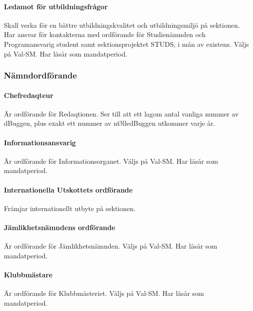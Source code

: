 \documentclass[a4paper,12pt]{article}
\begin{document}
\paragraph{Ledamot för utbildningsfrågor}

Skall verka för en bättre utbildningskvalitet och utbildningsmiljö på sektionen. Har ansvar för kontakterna med ordförande för Studienämnden och Programansvarig student samt sektionsprojektet STUDS, i mån av existens. Väljs på Val-SM. Har läsår som mandatperiod.

\subsubsection{Nämndordförande}

\paragraph{Chefredaqteur}

Är ordförande för Redaqtionen. Ser till att ett lagom antal vanliga nummer av dBuggen, plus exakt ett nummer av nØlledBuggen utkommer varje år.

\paragraph{Informationsansvarig}

Är ordförande för Informationsorganet. Väljs på Val-SM. Har läsår som mandatperiod.

\paragraph{Internationella Utskottets ordförande}

Främjar internationellt utbyte på sektionen.

\paragraph{Jämlikhetsnämndens ordförande}

Är ordförande för Jämlikhetsnämnden. Väljs på Val-SM. Har läsår som mandatperiod.

\paragraph{Klubbmästare}

Är ordförande för Klubbmästeriet. Väljs på Val-SM. Har läsår som mandatperiod.
\end{document}
